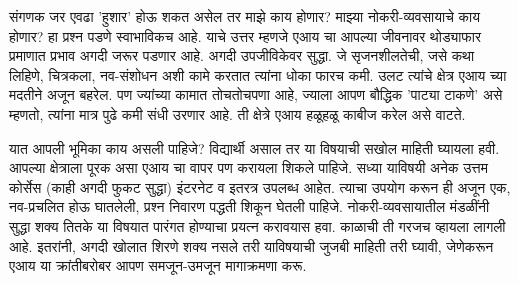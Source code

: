 संगणक जर एवढा 'हुशार' होऊ शकत असेल तर माझे काय होणार? माझ्या नोकरी-व्यवसायाचे काय होणार? हा प्रश्न पडणे स्वाभाविकच आहे. याचे उत्तर म्हणजे एआय चा आपल्या जीवनावर थोड्याफार प्रमाणात प्रभाव अगदी जरूर पडणार आहे. अगदी उपजीविकेवर सुद्धा. जे सृजनशीलतेची, जसे कथा लिहिणे, चित्रकला, नव-संशोधन अशी कामे करतात त्यांना धोका फारच कमी. उलट त्यांचे क्षेत्र एआय च्या मदतीने अजून बहरेल. पण ज्यांच्या कामात तोचतोचपणा आहे, ज्याला आपण बौद्धिक 'पाट्या टाकणे' असे म्हणतो, त्यांना मात्र पुढे कमी संधी उरणार आहे. ती क्षेत्रे एआय हळूहळू काबीज करेल असे वाटते.

यात आपली भूमिका काय असली पाहिजे? विद्यार्थी असाल तर या विषयाची सखोल माहिती घ्यायला हवी. आपल्या क्षेत्राला पूरक असा एआय चा वापर पण करायला शिकले पाहिजे. सध्या याविषयी अनेक उत्तम कोर्सेस (काही अगदी फुकट  सुद्धा) इंटरनेट व इतरत्र उपलब्ध आहेत. त्याचा उपयोग करून ही अजून एक, नव-प्रचलित होऊ घातलेली, प्रश्न निवारण पद्धती  शिकून घेतली पाहिजे. नोकरी-व्यवसायातील मंडळींनी सुद्धा शक्य तितके या विषयात पारंगत होण्याचा प्रयत्न करावयास हवा. काळाची ती गरजच व्हायला लागली आहे. इतरांनी, अगदी खोलात शिरणे शक्य नसले तरी याविषयाची जुजबी माहिती तरी घ्यावी, जेणेकरून एआय या क्रांतीबरोबर आपण समजून-उमजून मागाक्रमणा करू.



